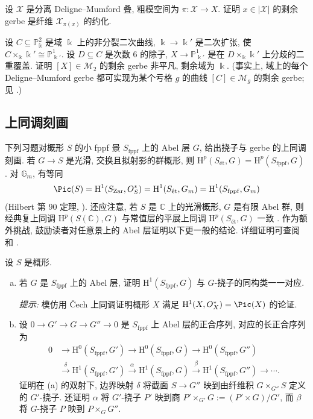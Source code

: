 \begin{exercise}\label{src:7.4.41}
设 $\mathcal X$ 是分离 Deligne--Mumford 叠, 粗模空间为 $\pi:\mathcal X\to X$. 证明 $x\in|\mathcal X|$ 的剩余 gerbe 是纤维 $\mathcal X_{\pi(x)}$ 的约化.
\end{exercise}
\begin{exercise}\label{src:7.4.42}
设 $C\subseteq\mathbb P_{\Bbbk}^2$ 是域 $\Bbbk$ 上的非分裂二次曲线, $\Bbbk\to\Bbbk'$ 是二次扩张, 使 $C\times_{\Bbbk}\Bbbk'\cong\mathbb P_{\Bbbk'}^1$. 设 $D\subseteq C$ 是次数 $6$ 的除子, $X\to\mathbb P_{\Bbbk'}^1$ 是在 $D\times_{\Bbbk}\Bbbk'$ 上分歧的二重覆盖. 证明 $[X]\in\mathcal M_2$ 的剩余 gerbe 非平凡, 剩余域为 $\Bbbk$. (事实上, 域上的每个 Deligne--Mumford gerbe 都可实现为某个亏格 $g$ 的曲线 $[C]\in\mathcal M_g$ 的剩余 gerbe; 见 \cite{BL24}.)
\end{exercise}
\subsection{上同调刻画}\label{src:7.4.6-subsection}
下列习题对概形 $S$ 的小 fppf 景 $S_{\mathrm{fppf}}$ 上的 Abel 层 $G$, 给出挠子与 gerbe 的上同调刻画. 若 $G\to S$ 是光滑, 交换且拟射影的群概形, 则 $\mathrm H^p(S_{\text{ét}},G)=\mathrm H^p(S_{\mathrm{fppf}},G)$ \cite[定理 3.9]{Mil80}. 对 $\mathbb G_m$, 有等同
\[
\Pic(S)=\mathrm H^1(S_{\mathrm{Zar}},\mathcal O_S^*)=\mathrm H^1(S_{\text{ét}},\mathbb G_m)=\mathrm H^1(S_{\mathrm{fppf}},\mathbb G_m)
\]
(Hilbert 第 $90$ 定理, \cite[命题 4.9]{Mil80}). 还应注意, 若 $S$ 是 $\mathbb C$ 上的光滑概形, $G$ 是有限 Abel 群, 则经典复上同调 $\mathrm H^p(S(\mathbb C),G)$ 与常值层的平展上同调 $\mathrm H^p(S_{\text{ét}},G)$ 一致 \cite[定理 3.12]{Mil80}.
作为额外挑战, 鼓励读者对任意景上的 Abel 层证明以下更一般的结论. 详细证明可查阅 \cite{Gir71} 和 \cite[\S12]{Ols16}.
\begin{exercise}[挠子]\label{src:7.4.43}
设 $S$ 是概形.
\begin{enumerate}[(a)]
\item 若 $G$ 是 $S_{\mathrm{fppf}}$ 上的 Abel 层, 证明 $\mathrm H^1(S_{\mathrm{fppf}},G)$ 与 $G$-挠子的同构类一一对应.

\textit{提示:} 模仿用 Čech 上同调证明概形 $X$ 满足 $\mathrm H^1(X,\mathcal O_X^*)=\Pic(X)$ 的论证.
\item 设 $0\to G'\to G\to G''\to0$ 是 $S_{\mathrm{fppf}}$ 上 Abel 层的正合序列, 对应的长正合序列为
\[
\begin{aligned}
0&\longrightarrow\mathrm H^0(S_{\mathrm{fppf}},G')\longrightarrow\mathrm H^0(S_{\mathrm{fppf}},G)\longrightarrow\mathrm H^0(S_{\mathrm{fppf}},G'')\\
&\xrightarrow{\delta}\mathrm H^1(S_{\mathrm{fppf}},G')\xrightarrow{\alpha}\mathrm H^1(S_{\mathrm{fppf}},G)\xrightarrow{\beta}\mathrm H^1(S_{\mathrm{fppf}},G'')\longrightarrow\cdots.
\end{aligned}
\]
证明在 (a) 的双射下, 边界映射 $\delta$ 将截面 $S\to G''$ 映到由纤维积 $G\times_{G''}S$ 定义的 $G'$-挠子. 还证明 $\alpha$ 将 $G'$-挠子 $P'$ 映到商 $P'\times_{G'}G:=(P'\times G)/G'$, 而 $\beta$ 将 $G$-挠子 $P$ 映到 $P\times_G G''$.
\end{enumerate}
\end{exercise}
